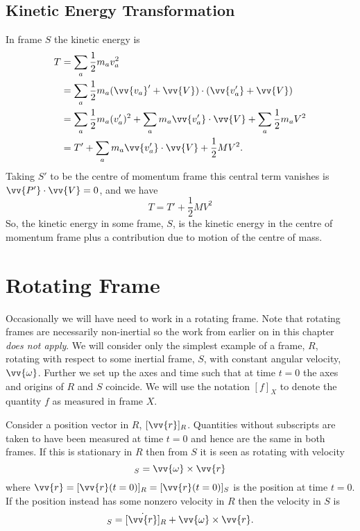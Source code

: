 \documentclass[fleqn]{NotesClass}
\begin{document}
    \subsection{Kinetic Energy Transformation}
    In frame \(S\) the kinetic energy is
    \begin{align}
        T &= \sum_a \frac{1}{2}m_av_a^2\\
        &= \sum_a \frac{1}{2}m_a(\vv{v_a}' + \vv{V})\cdot (\vv{v_a'} + \vv{V})\\
        &= \sum_a\frac{1}{2}m_a(v_a')^2 + \sum_a m_a\vv{v_a'}\cdot\vv{V} + \sum_a \frac{1}{2}m_aV^2\\
        &= T' + \sum_a m_a\vv{v_a'}\cdot\vv{V} + \frac{1}{2}MV^2.
    \end{align}
    Taking \(S'\) to be the centre of momentum frame this central term vanishes is \(\vv{P'}\cdot\vv{V} = 0\), and we have
    \begin{equation}
        T = T' + \frac{1}{2}MV^2
    \end{equation}
    So, the kinetic energy in some frame, \(S\), is the kinetic energy in the centre of momentum frame plus a contribution due to motion of the centre of mass.
    
    \section{Rotating Frame}\label{sec:rotating frame}
    Occasionally we will have need to work in a rotating frame.
    Note that rotating frames are necessarily non-inertial so the work from earlier on in this chapter \emph{does not apply}.
    We will consider only the simplest example of a frame, \(R\), rotating with respect to some inertial frame, \(S\), with constant angular velocity, \(\vv{\omega}\).
    Further we set up the axes and time such that at time \(t = 0\) the axes and origins of \(R\) and \(S\) coincide.
    We will use the notation \([f]_X\) to denote the quantity \(f\) as measured in frame \(X\).
    
    Consider a position vector in \(R\), \([\vv{r}]_{R}\).
    Quantities without subscripts are taken to have been measured at time \(t = 0\) and hence are the same in both frames.
    If this is stationary in \(R\) then from \(S\) it is seen as rotating with velocity
    \begin{equation}
        [\vv{v}]_S = \vv{\omega} \times \vv{r}
    \end{equation}
    where \(\vv{r} = [\vv{r}(t = 0)]_R = [\vv{r}(t = 0)]_S\) is the position at time \(t = 0\).
    If the position instead has some nonzero velocity in \(R\) then the velocity in \(S\) is
    \begin{equation}
        [\dot{\vv{r}}]_S = [\dot{\vv{r}}]_R + \vv{\omega}\times\vv{r}.
    \end{equation}
    
\end{document}
